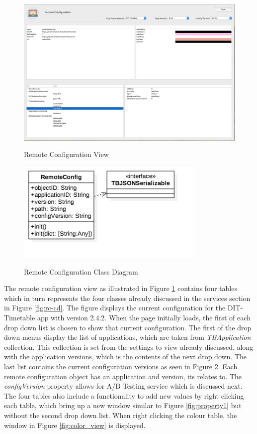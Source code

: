 \begin{figure}[!h]
    \caption{Remote Configuration View}
    \centering
    \includegraphics[width=150mm]{images/dashboard/remote-config}
    \label{fig:remote-config-view}
\end{figure}

\begin{figure}[!h]
    \caption{Remote Configuration Class Diagram}
    \centering
    \includegraphics[width=90mm]{images/classdiagrams/RemoteConfig}
    \label{fig:remote-config-cd}
\end{figure} 

The remote configuration view as illustrated in Figure \ref{fig:remote-config-view} contains four tables which in turn represents the four classes already discussed in the services section in Figure \ref{fig:rc-cd}. The figure displays the current configuration for the DIT-Timetable app with version 2.4.2. When the page initially loads, the first of each drop down list is chosen to show that current configuration. The first of the drop down menus display the list of applications, which are taken from \textit{TBApplication} collection. This collection is set from the settings to view already discussed, along with the application versions, which is the contents of the next drop down. The last list contains the current configuration versions as seen in Figure \ref{fig:remote-config-cd}. Each remote configuration object has an application and version, its relates to. The \textit{configVersion} property allows for A/B Testing service which is discussed next. The four tables also include a functionality to add new values by right clicking each table, which bring up a new window similar to Figure \ref{fig:property1} but without the second drop down list. When right clicking the colour table, the window in Figure \ref{fig:color_view} is displayed.

